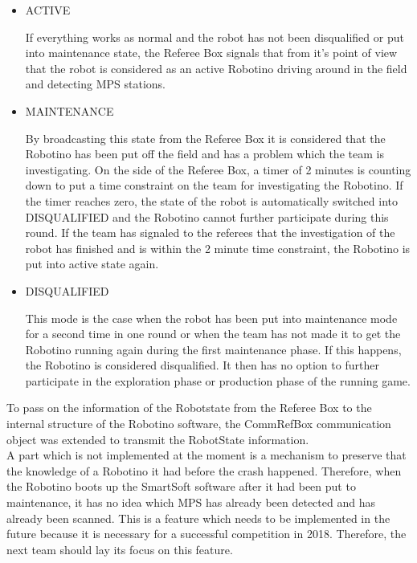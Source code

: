 \begin{itemize}

\item ACTIVE

If everything works as normal and the robot has not been disqualified or put into maintenance state, the Referee Box signals that from it's point of view that the robot is considered as an active Robotino driving around in the field and detecting MPS stations. 


\item MAINTENANCE

By broadcasting this state from the Referee Box it is considered that the Robotino has been put off the field and has a problem which the team is investigating. On the side of the Referee Box, a timer of 2 minutes is counting down to put a time constraint on the team for investigating the Robotino. If the timer reaches zero, the state of the robot is automatically switched into DISQUALIFIED and the Robotino cannot further participate during this round. If the team has signaled to the referees that the investigation of the robot has finished and is within the 2 minute time constraint, the Robotino is put into active state again. 

\item DISQUALIFIED

This mode is the case when the robot has been put into maintenance mode for a second time in one round or when the team has not made it to get the Robotino running again during the first maintenance phase. If this happens, the Robotino is considered disqualified. It then has no option to further participate in the exploration phase or production phase of the running game.  

\end{itemize}

To pass on the information of the Robotstate from the Referee Box to the internal structure of the Robotino software, the CommRefBox communication object was extended to transmit the RobotState information. \\


A part which is not implemented at the moment is a mechanism to preserve that the knowledge of a Robotino it had before the crash happened. Therefore, when the Robotino boots up the SmartSoft software after it had been put to maintenance, it has no idea which MPS has already been detected and has already been scanned. This is a feature which needs to be implemented in the future because it is necessary for a successful competition in 2018. Therefore, the next team should lay its focus on this feature. \\

